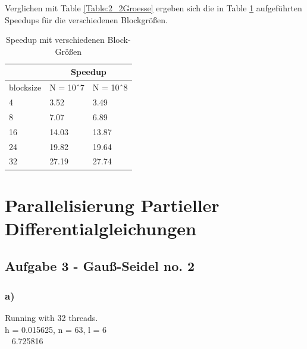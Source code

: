 \documentclass{report}
\begin{document}
Verglichen mit Table \ref{Table:2_2Groesse} ergeben sich die in Table \ref{Table:2_2Speedup} aufgeführten Speedups für die verschiedenen Blockgrößen. 
\begin{table}
	\begin{tabular}{l|l|l|}
		\cline{2-3}
		& \multicolumn{2}{c|}{Speedup} \\ \hline
		\multicolumn{1}{|l|}{blocksize} & N = 10ˆ7      & N = 10ˆ8     \\ \hline
		\multicolumn{1}{|l|}{4}         & 3.52          & 3.49         \\ \hline
		\multicolumn{1}{|l|}{8}         & 7.07          &       6.89       \\ \hline
		\multicolumn{1}{|l|}{16}        & 14.03         &       13.87       \\ \hline
		\multicolumn{1}{|l|}{24}        & 19.82         &     19.64         \\ \hline
		\multicolumn{1}{|l|}{32}        & 27.19         & 27.74        \\ \hline
	\end{tabular}
	\caption{Speedup mit verschiedenen Block-Größen}
	\label{Table:2_2Speedup}
\end{table}
\section{Parallelisierung Partieller Differentialgleichungen}
\subsection{Aufgabe 3 - Gauß-Seidel no. 2}

\subsubsection{a)}

Running with 32 threads.\\
h = 0.015625, n = 63, l = 6\\
~ 6.725816\\
\end{document}
